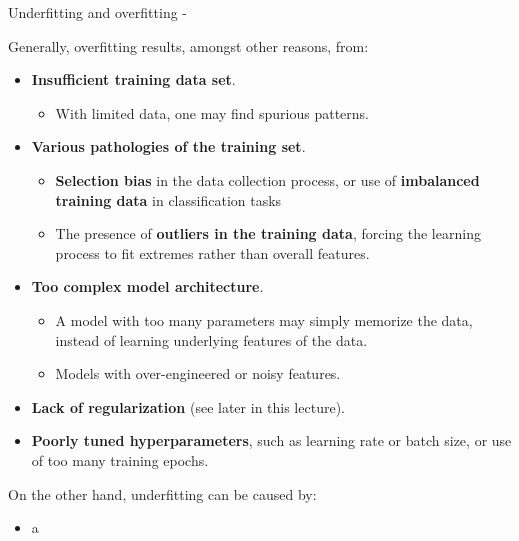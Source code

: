 \begin{frame}[t,allowframebreaks]{Underfitting and overfitting -}
     \framebreak
 
     Generally, \gls{overfitting} results, 
     amongst other reasons, from:
     \vspace{0.2cm}
     \begin{itemize}
        \item {\bf Insufficient training data set}.
        \begin{itemize}
            \item With limited data, one may find spurious patterns. 
        \end{itemize}    
        \item {\bf Various pathologies of the training set}.
        \begin{itemize}
            \item {\bf Selection bias} in the data collection process,
            or use of {\bf imbalanced training data} in classification tasks
            \item The presence of {\bf outliers in the training data},
            forcing the learning process to fit extremes rather than overall features.
        \end{itemize}    
        \item {\bf Too complex model architecture}.
        \begin{itemize}
            \item A model with too many parameters may simply memorize the
            data, instead of learning underlying features of the data.
            \item Models with over-engineered or noisy features.
        \end{itemize}    
        \item {\bf Lack of regularization} (see later in this lecture).
        \item {\bf Poorly tuned hyperparameters}, such as learning rate or batch size,
        or use of too many training epochs.

     \end{itemize}

     \framebreak
 
     On the other hand, \gls{underfitting} can be caused by:
     \vspace{0.2cm}
     \begin{itemize}
        \item a
     \end{itemize}
  
 
 \end{frame}
 